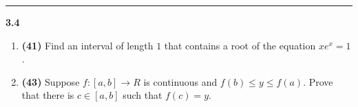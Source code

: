 \documentclass[fleqn]{article}
\begin{document}
  \rule{15cm}{2pt}

  \textbf{3.4}
  \begin{enumerate}
    \item \textbf{(41)} Find an interval of length $1$ that contains a root of the equation $x e^x=1$.

        


    \item \textbf{(43)} Suppose $f: [a, b] \longrightarrow R$ is continuous and $f(b) \leq y \leq f(a)$. Prove that there is
    $c \in [a, b]$ such that $f(c)=y$.

        
    
  \end{enumerate}
\end{document}

